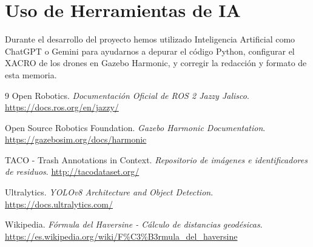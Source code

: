 \documentclass[11pt,a4paper]{article}
\begin{document}
\section{Uso de Herramientas de IA}
Durante el desarrollo del proyecto hemos utilizado Inteligencia Artificial como ChatGPT o Gemini para ayudarnos a depurar el código Python, configurar el XACRO de los drones en Gazebo Harmonic, y corregir la redacción y formato de esta memoria.

\begin{thebibliography}{9}
Open Robotics.
\textit{Documentación Oficial de ROS 2 Jazzy Jalisco}.
\url{https://docs.ros.org/en/jazzy/}

Open Source Robotics Foundation.
\textit{Gazebo Harmonic Documentation}.
\url{https://gazebosim.org/docs/harmonic}

TACO - Trash Annotations in Context.
\textit{Repositorio de imágenes e identificadores de residuos}.
\url{http://tacodataset.org/}

Ultralytics.
\textit{YOLOv8 Architecture and Object Detection}.
\url{https://docs.ultralytics.com/}

Wikipedia.
\textit{Fórmula del Haversine - Cálculo de distancias geodésicas}.
\url{https://es.wikipedia.org/wiki/F%C3%B3rmula_del_haversine}
\end{thebibliography}
\end{document}

